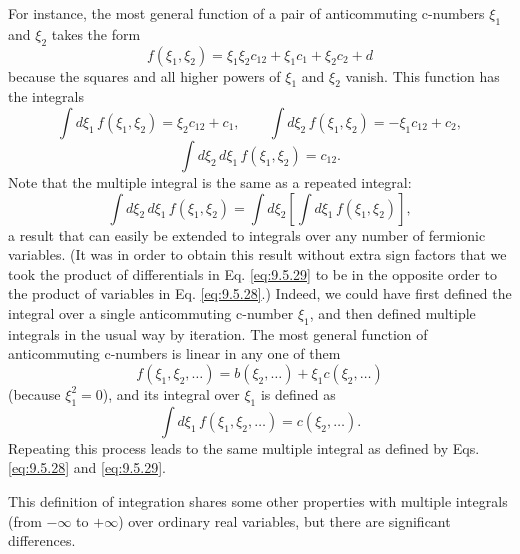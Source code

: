 For instance, the most general function of a pair of anticommuting c-numbers
$\xi_1$ and $\xi_2$ takes the form
\[
f(\xi_1,\xi_2)=\xi_1\xi_2c_{12}+\xi_1c_1+\xi_2c_2+d
\]
because the squares and all higher powers of $\xi_1$ and $\xi_2$ vanish. This
function has the integrals
\[
\int d\xi_1\,f(\xi_1,\xi_2)=\xi_2c_{12}+c_1,
\qquad
\int d\xi_2\,f(\xi_1,\xi_2)=-\xi_1c_{12}+c_2,
\]
\[
\int d\xi_2\,d\xi_1\,f(\xi_1,\xi_2)=c_{12}.
\]
Note that the multiple integral is the same as a repeated integral:
\[
\int d\xi_2\,d\xi_1\,f(\xi_1,\xi_2)
=\int d\xi_2\left[\int d\xi_1\,f(\xi_1,\xi_2)\right],
\]
a result that can easily be extended to integrals over any number of fermionic
variables. (It was in order to obtain this result without extra sign factors
that we took the product of differentials in Eq. \eqref{eq:9.5.29} to be in the opposite
order to the product of variables in Eq. \eqref{eq:9.5.28}.) Indeed, we could have first
defined the integral over a single anticommuting c-number $\xi_1$, and then
defined multiple integrals in the usual way by iteration. The most general
function of anticommuting c-numbers is linear in any one of them
\[
f(\xi_1,\xi_2,\ldots)=b(\xi_2,\ldots)+\xi_1c(\xi_2,\ldots)
\]
(because $\xi_1^2=0$), and its integral over $\xi_1$ is defined as
\[
\int d\xi_1\,f(\xi_1,\xi_2,\ldots)=c(\xi_2,\ldots).
\]
Repeating this process leads to the same multiple integral as defined by Eqs.
\eqref{eq:9.5.28} and \eqref{eq:9.5.29}.

This definition of integration shares some other properties with multiple
integrals (from $-\infty$ to $+\infty$) over ordinary real variables, but there
are significant differences.

